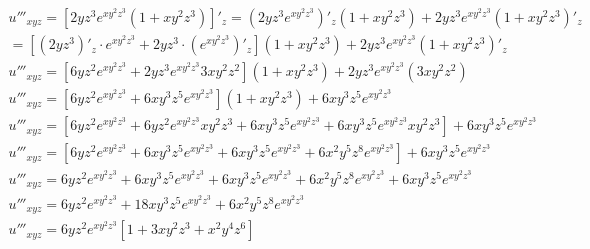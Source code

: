 \documentclass[a4paper,fleqn,12pt]{article}
\theoremstyle{definition}
\begin{document}
\begin{gather*}
u'''_{xyz} = \left[ 2yz^3e^{xy^2z^3} (1 + xy^2z^3) \right]'_z = (2yz^3e^{xy^2z^3})'_z (1 + xy^2z^3) + 2yz^3e^{xy^2z^3}(1 + xy^2z^3)'_z\\
=  \left[(2yz^3)'_z\cdot e^{xy^2z^3}+ 2yz^3 \cdot (e^{xy^2z^3})'_z\right] (1 + xy^2z^3) + 2yz^3e^{xy^2z^3}(1 + xy^2z^3)'_z \\
u'''_{xyz} = \left[6yz^2e^{xy^2z^3} +  2yz^3e^{xy^2z^3}3xy^2z^2 \right] (1 + xy^2z^3) + 2yz^3e^{xy^2z^3} (3xy^2z^2) \\
u'''_{xyz} =  \left[6yz^2e^{xy^2z^3} +  6xy^3z^5e^{xy^2z^3} \right] (1 + xy^2z^3) + 6xy^3z^5e^{xy^2z^3} \\
u'''_{xyz} = \left[6yz^2e^{xy^2z^3} + 6yz^2e^{xy^2z^3} xy^2z^3 + 6xy^3z^5e^{xy^2z^3} + 6xy^3z^5e^{xy^2z^3} xy^2z^3\right] + 6xy^3z^5e^{xy^2z^3}\\
u'''_{xyz} = \left[6yz^2e^{xy^2z^3} + 6xy^3z^5e^{xy^2z^3} + 6xy^3z^5e^{xy^2z^3} + 6x^2y^5z^8e^{xy^2z^3}\right] + 6xy^3z^5e^{xy^2z^3}\\
u'''_{xyz} = 6yz^2e^{xy^2z^3} + 6xy^3z^5e^{xy^2z^3} + 6xy^3z^5e^{xy^2z^3} + 6x^2y^5z^8e^{xy^2z^3}+ 6xy^3z^5e^{xy^2z^3}\\
u'''_{xyz} = 6yz^2e^{xy^2z^3} + 18xy^3z^5e^{xy^2z^3} + 6x^2y^5z^8e^{xy^2z^3}\\
u'''_{xyz} = 6yz^2e^{xy^2z^3} \left[1 + 3xy^2z^3 + x^2y^4z^6 \right]
\end{gather*}
\end{document}
